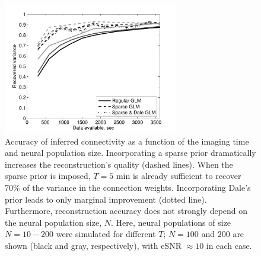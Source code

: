 \documentclass[aoas,preprint]{imsart}
\begin{document}
\begin{figure}[t!]
\centering
\includegraphics[width=3in]{../figs/FigureA7_recvar_NT}
\caption{Accuracy of inferred connectivity as a function of the
imaging time and neural population size. Incorporating a sparse prior
dramatically increases the reconstruction's quality (dashed
lines). When the sparse prior is imposed, $T=5$ min is already
sufficient to recover $70\%$ of the variance in the connection
weights. Incorporating Dale's prior leads to only marginal improvement
(dotted line). Furthermore, reconstruction accuracy does not strongly
depend on the neural population size, $N$. Here, neural populations of
size $N=10-200$ were simulated for different $T$; $N=100$ and $200$
are shown (black and gray, respectively), with eSNR $\approx 10$ in each
case.}
\label{fig:recvar-NT}
\end{figure}
\end{document}
